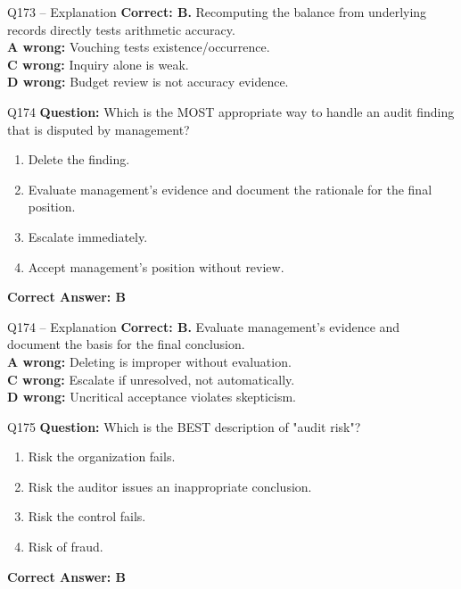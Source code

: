 \documentclass[aspectratio=169,10pt]{beamer}
\begin{document}
	\begin{frame}[t]{Q173 -- Explanation}
		\small
		\textbf{Correct: B.} Recomputing the balance from underlying records directly tests arithmetic accuracy. \\[4pt]
		\textbf{A wrong:} Vouching tests existence/occurrence. \\[2pt]
		\textbf{C wrong:} Inquiry alone is weak. \\[2pt]
		\textbf{D wrong:} Budget review is not accuracy evidence.
	\end{frame}
	
	\begin{frame}[t]{Q174}
		\small
		\textbf{Question:} Which is the MOST appropriate way to handle an audit finding that is disputed by management?
		\begin{enumerate}[label=\Alph*.,itemsep=1pt,topsep=2pt]
			\item Delete the finding.
			\item Evaluate management's evidence and document the rationale for the final position.
			\item Escalate immediately.
			\item Accept management's position without review.
		\end{enumerate}
		\vspace{4pt}
		\textbf{Correct Answer: B}
	\end{frame}
	
	\begin{frame}[t]{Q174 -- Explanation}
		\small
		\textbf{Correct: B.} Evaluate management's evidence and document the basis for the final conclusion. \\[4pt]
		\textbf{A wrong:} Deleting is improper without evaluation. \\[2pt]
		\textbf{C wrong:} Escalate if unresolved, not automatically. \\[2pt]
		\textbf{D wrong:} Uncritical acceptance violates skepticism.
	\end{frame}
	
	\begin{frame}[t]{Q175}
		\small
		\textbf{Question:} Which is the BEST description of "audit risk"?
		\begin{enumerate}[label=\Alph*.,itemsep=1pt,topsep=2pt]
			\item Risk the organization fails.
			\item Risk the auditor issues an inappropriate conclusion.
			\item Risk the control fails.
			\item Risk of fraud.
		\end{enumerate}
		\vspace{4pt}
		\textbf{Correct Answer: B}
	\end{frame}
	
\end{document}
